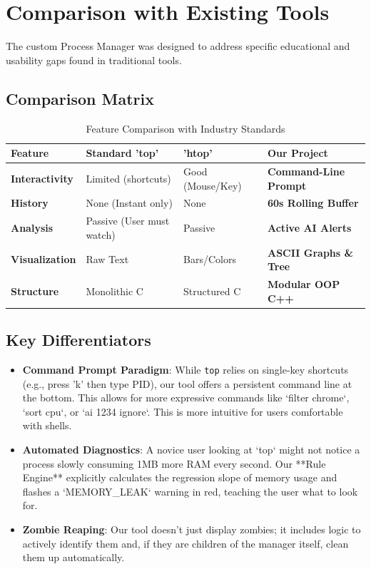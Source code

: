 \documentclass[a4paper,12pt]{article}
\begin{document}
\newpage

\section{Comparison with Existing Tools}

The custom Process Manager was designed to address specific educational and usability gaps found in traditional tools.

\subsection{Comparison Matrix}

\begin{table}[H]
    \centering
    \caption{Feature Comparison with Industry Standards}
    \begin{tabular}{|l|p{4cm}|p{4cm}|p{4cm}|}
    \hline
    \textbf{Feature} & \textbf{Standard 'top'} & \textbf{'htop'} & \textbf{Our Project} \\ \hline
    \textbf{Interactivity} & Limited (shortcuts) & Good (Mouse/Key) & \textbf{Command-Line Prompt} \\ \hline
    \textbf{History} & None (Instant only) & None & \textbf{60s Rolling Buffer} \\ \hline
    \textbf{Analysis} & Passive (User must watch) & Passive & \textbf{Active AI Alerts} \\ \hline
    \textbf{Visualization} & Raw Text & Bars/Colors & \textbf{ASCII Graphs \& Tree} \\ \hline
    \textbf{Structure} & Monolithic C & Structured C & \textbf{Modular OOP C++} \\ \hline
    \end{tabular}
\end{table}

\subsection{Key Differentiators}
\begin{itemize}
    \item \textbf{Command Prompt Paradigm}: While \texttt{top} relies on single-key shortcuts (e.g., press 'k' then type PID), our tool offers a persistent command line at the bottom. This allows for more expressive commands like `filter chrome`, `sort cpu`, or `ai 1234 ignore`. This is more intuitive for users comfortable with shells.
    \item \textbf{Automated Diagnostics}: A novice user looking at `top` might not notice a process slowly consuming 1MB more RAM every second. Our **Rule Engine** explicitly calculates the regression slope of memory usage and flashes a `MEMORY_LEAK` warning in red, teaching the user what to look for.
    \item \textbf{Zombie Reaping}: Our tool doesn't just display zombies; it includes logic to actively identify them and, if they are children of the manager itself, clean them up automatically.
\end{itemize}
\end{document}
